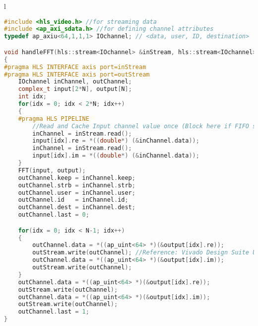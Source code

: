 \begin{table}[!h]
\centering
\caption{AXI-Stream Input-Output data handler}
\label{fhewcode1:fft_stream}
\begin{tabular}{l}
\toprule
\begin{lstlisting}[columns=fullflexible, language=C++,escapechar=\$]
#include <hls_video.h> //for streaming data
#include <ap_axi_sdata.h> //for defining channel attributes
typedef ap_axiu<64,1,1,1> IOchannel; // <data, user, ID, destination>

void handleFFT(hls::stream<IOchannel> &inStream, hls::stream<IOchannel> &outStream)
{
#pragma HLS INTERFACE axis port=inStream
#pragma HLS INTERFACE axis port=outStream
    IOchannel inChannel, outChannel;
    complex_t input[2*N], output[N];
    int idx;
    for(idx = 0; idx < 2*N; idx++)
    {
    #pragma HLS PIPELINE
        //Read and Cache Input channel value once (Block here if FIFO sender is empty)
        inChannel = inStream.read();
        input[idx].re = *((double*) (&inChannel.data));
        inChannel = inStream.read();
        input[idx].im = *((double*) (&inChannel.data));
    }
    FFT(input, output);
    outChannel.keep = inChannel.keep;
    outChannel.strb = inChannel.strb;
    outChannel.user = inChannel.user;
    outChannel.id   = inChannel.id;
    outChannel.dest = inChannel.dest;
    outChannel.last = 0;

    for(idx = 0; idx < N-1; idx++)
    {
		outChannel.data = *((ap_uint<64> *)(&output[idx].re));
		outStream.write(outChannel); //Reference: Vivado Design Suite User Guide
		outChannel.data = *((ap_uint<64> *)(&output[idx].im));
		outStream.write(outChannel);
    }
    outChannel.data = *((ap_uint<64> *)(&output[idx].re));
    outStream.write(outChannel);
    outChannel.data = *((ap_uint<64> *)(&output[idx].im));
    outStream.write(outChannel);
    outChannel.last = 1;
}
\end{lstlisting}
\\
\bottomrule
\end{tabular}
\end{table}

